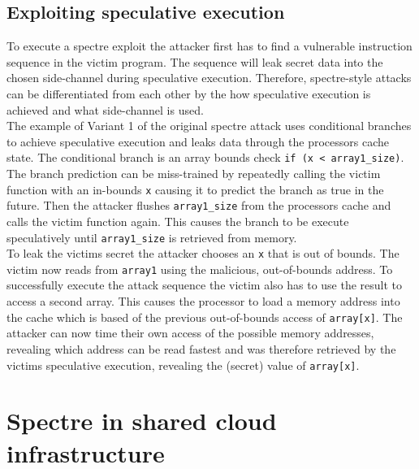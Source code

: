 \documentclass[conference,compsoc,final,a4paper]{IEEEtran}
\begin{document}
\subsection{Exploiting speculative execution}
To execute a spectre exploit the attacker first has to find a vulnerable instruction sequence in the victim program. The sequence will leak secret data into the chosen
side-channel during speculative execution. Therefore, spectre-style attacks can be differentiated from each other by the how speculative execution is achieved
and what side-channel is used. \cite{kocher2018spectre} \\
The example of Variant 1 of the original spectre attack uses conditional branches to achieve speculative
execution and leaks data through the processors cache state. The conditional branch is an array bounds check \lstinline|if (x < array1_size)|. The branch prediction
can be miss-trained by repeatedly calling the victim function with an in-bounds \lstinline|x| causing it to predict the branch as true in the future. Then the
attacker flushes \lstinline|array1_size| from the processors cache and calls the victim function again. This causes the branch to be execute speculatively
until \lstinline|array1_size| is retrieved from memory. \\
To leak the victims secret the attacker chooses an \lstinline|x| that is out of bounds. The victim
now reads from \lstinline|array1| using the malicious, out-of-bounds address. To successfully execute the attack sequence the victim also has to use the result to
access a second array. This causes the processor to load a memory address into the cache which is based of the previous out-of-bounds access of \lstinline|array[x]|.
The attacker can now time their own access of the possible memory addresses, revealing which address can be read fastest and was therefore retrieved by the victims
speculative execution, revealing the (secret) value of \lstinline|array[x]|.
\section{Spectre in shared cloud infrastructure}
\end{document}

